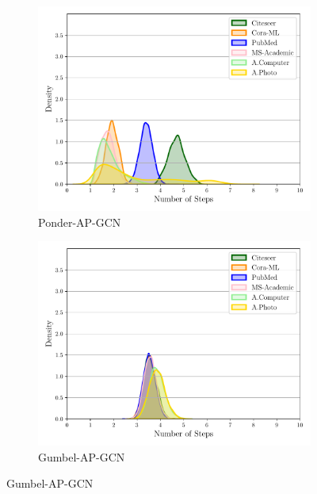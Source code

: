 \documentclass{gdl}
\begin{document}
\begin{figure}[p]
\begin{minipage}[t]{0.48\textwidth}
        \begin{subfigure}[b]{0.8\textwidth}
            \centering
            \includegraphics[width=\textwidth]{Ponder-AP-GCN_steps_distribution.pdf}
            \captionsetup{justification=centerlast}
            \caption{Ponder-AP-GCN}
            \label{fig:step_dist_Ponder_AP_GCN}
        \end{subfigure}
        
        \begin{subfigure}[b]{0.8\textwidth}
            \centering
            \includegraphics[width=\textwidth]{Gumbel-AP-GCN_steps_distribution.pdf}
            \captionsetup{justification=centerlast}
            \caption{Gumbel-AP-GCN}
            \label{fig:step_dist_Gumbel_AP_GCN}
        \end{subfigure}
        

\end{minipage}
\end{figure}
\end{document}
